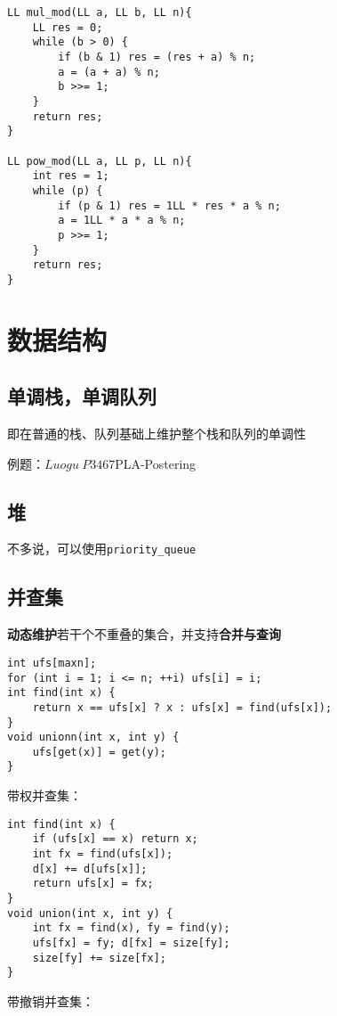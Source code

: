 \documentclass[UTF8]{ctexart}
\begin{document}
\begin{lstlisting}
LL mul_mod(LL a, LL b, LL n){
    LL res = 0;
    while (b > 0) {
        if (b & 1) res = (res + a) % n;
        a = (a + a) % n;
        b >>= 1;
    }
    return res;
}

LL pow_mod(LL a, LL p, LL n){
    int res = 1;
    while (p) {
        if (p & 1) res = 1LL * res * a % n;
        a = 1LL * a * a % n;
        p >>= 1;
    }
    return res;
}
\end{lstlisting}

\section{数据结构}

\subsection{单调栈，单调队列}

即在普通的栈、队列基础上维护整个栈和队列的单调性

例题：$Luogu\ P3467$PLA-Postering

\subsection{堆}

不多说，可以使用\texttt{priority\_queue}

\subsection{并查集}

\textbf{动态维护}若干个不重叠的集合，并支持\textbf{合并与查询}

\begin{lstlisting}
int ufs[maxn];
for (int i = 1; i <= n; ++i) ufs[i] = i;
int find(int x) {
    return x == ufs[x] ? x : ufs[x] = find(ufs[x]);
}
void unionn(int x, int y) {
    ufs[get(x)] = get(y);
}
\end{lstlisting}

带权并查集：

\begin{lstlisting}
int find(int x) {
    if (ufs[x] == x) return x;
    int fx = find(ufs[x]);
    d[x] += d[ufs[x]];
    return ufs[x] = fx;
}
void union(int x, int y) {
    int fx = find(x), fy = find(y);
    ufs[fx] = fy; d[fx] = size[fy];
    size[fy] += size[fx];
}
\end{lstlisting}

带撤销并查集：
\end{document}
